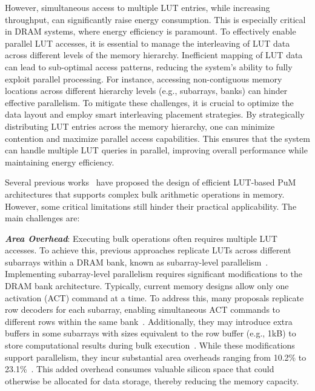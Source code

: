 However, simultaneous access to multiple LUT entries, while increasing throughput, can significantly raise energy consumption. This is especially critical in DRAM systems, where energy efficiency is paramount. To effectively enable parallel LUT accesses, it is essential to manage the interleaving of LUT data across different levels of the memory hierarchy. Inefficient mapping of LUT data can lead to sub-optimal access patterns, reducing the system's ability to fully exploit parallel processing. For instance, accessing non-contiguous memory locations across different hierarchy levels (e.g., subarrays, banks) can hinder effective parallelism. To mitigate these challenges, it is crucial to optimize the data layout and employ smart interleaving placement strategies. By strategically distributing LUT entries across the memory hierarchy, one can minimize contention and maximize parallel access capabilities. This ensures that the system can handle multiple LUT queries in parallel, improving overall performance while maintaining energy efficiency.

Several previous works~\cite{pluto, red-LUT, ppim, reconfigurable_pim, lacc, sal-pim} have proposed the design of efficient LUT-based PuM architectures that supports complex bulk arithmetic operations in memory. However, some critical limitations still hinder their practical applicability. The main challenges are:

\textbf{\textit{Area Overhead}}: Executing bulk operations often requires multiple LUT accesses. To achieve this, previous approaches replicate LUTs across different subarrays within a DRAM bank, known as subarray-level parallelism~\cite{salp}. Implementing subarray-level parallelism requires significant modifications to the DRAM bank architecture. Typically, current memory designs allow only one activation (ACT) command at a time. To address this, many proposals replicate row decoders for each subarray, enabling simultaneous ACT commands to different rows within the same bank~\cite{red-LUT, sal-pim}. Additionally, they may introduce extra buffers in some subarrays with sizes equivalent to the row buffer (e.g., 1kB) to store computational results during bulk execution~\cite{pluto}. While these modifications support parallelism, they incur substantial area overheads ranging from 10.2\% to 23.1\%~\cite{pluto}. This added overhead consumes valuable silicon space that could otherwise be allocated for data storage, thereby reducing the memory capacity.


